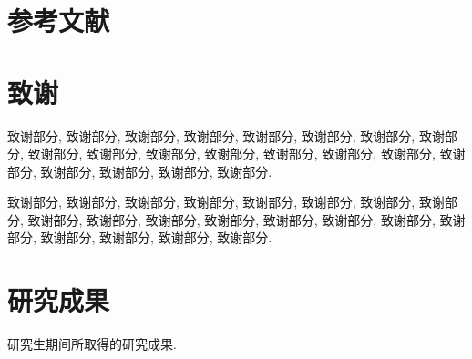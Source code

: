 \documentclass[UTF8,openright]{ctexbook}
\begin{document}
{}
\listofalgorithms

\clearpage
\mainmatter
\linespread{1.4}\selectfont









\chapter*{参考文献}



\chapter*{致谢}

致谢部分, 致谢部分, 致谢部分, 致谢部分, 致谢部分,
致谢部分, 致谢部分, 致谢部分, 致谢部分, 致谢部分,
致谢部分, 致谢部分, 致谢部分, 致谢部分, 致谢部分,
致谢部分, 致谢部分, 致谢部分, 致谢部分, 致谢部分.

致谢部分, 致谢部分, 致谢部分, 致谢部分, 致谢部分,
致谢部分, 致谢部分, 致谢部分, 致谢部分, 致谢部分,
致谢部分, 致谢部分, 致谢部分, 致谢部分, 致谢部分,
致谢部分, 致谢部分, 致谢部分, 致谢部分, 致谢部分.

\chapter*{研究成果}

研究生期间所取得的研究成果.
\end{document}
